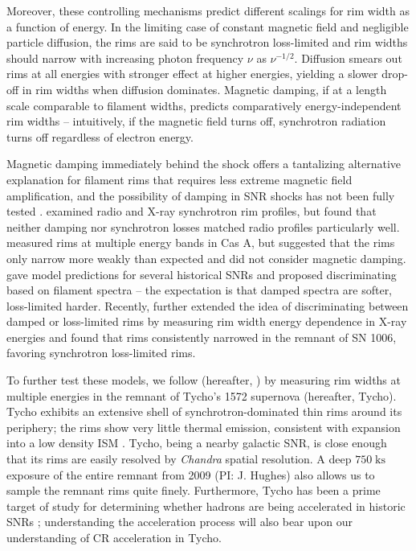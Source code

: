 \documentclass[iop, apj, numberedappendix]{emulateapj}
\newcommand*{\mt}{\mathrm}
\newcommand*{\unit}[1]{\;\mt{#1}}  %
\begin{document}
Moreover, these controlling mechanisms predict different scalings for rim width
as a function of energy.  In the limiting case of constant magnetic field and
negligible particle diffusion, the rims are said to be synchrotron loss-limited
and rim widths should narrow with increasing photon frequency $\nu$ as
$\nu^{-1/2}$. Diffusion smears out rims at all energies with stronger effect at
higher energies, yielding a slower drop-off in rim widths when diffusion
dominates.  Magnetic damping, if at a length scale comparable to filament
widths, predicts comparatively energy-independent rim widths -- intuitively, if
the magnetic field turns off, synchrotron radiation turns off regardless of
electron energy.

Magnetic damping immediately behind the shock offers a tantalizing alternative
explanation for filament rims that requires less extreme magnetic field
amplification, and the possibility of damping in SNR shocks has not been fully
tested \citep{pohl2005, marcowith2010}.  \citet{cassam-chenai2007} examined
radio and X-ray synchrotron rim profiles, but found that neither damping nor
synchrotron losses matched radio profiles particularly well.  \citet{araya2010}
measured rims at multiple energy bands in Cas A, but suggested that the rims
only narrow more weakly than expected and did not consider magnetic damping.
\citet{rettig2012} gave model predictions for several historical SNRs and
proposed discriminating based on filament spectra -- the expectation is that
damped spectra are softer, loss-limited harder.  Recently, \citet{ressler2014}
further extended the idea of discriminating between damped or loss-limited
rims by measuring rim width energy dependence in X-ray energies and found that
rims consistently narrowed in the remnant of SN 1006, favoring synchrotron
loss-limited rims.

To further test these models, we follow \citet{ressler2014} (hereafter,
) by measuring rim widths at multiple energies in the
remnant of Tycho's 1572 supernova (hereafter, Tycho).  Tycho exhibits an
extensive shell of synchrotron-dominated thin rims around its periphery; the
rims show very little thermal emission, consistent with expansion into a low
density ISM \citet{williams2013}.  Tycho, being a nearby galactic SNR, is close
enough that its rims are easily resolved by \textit{Chandra} spatial
resolution. A deep $750 \unit{ks}$ exposure of the entire remnant from 2009
(PI: J. Hughes) also allows us to sample the remnant rims quite finely.
Furthermore, Tycho has been a prime target of study for determining whether
hadrons are being accelerated in historic SNRs \citep[and references
therein]{morlino2012}; understanding the acceleration process will also bear
upon our understanding of CR acceleration in Tycho.
\end{document}
